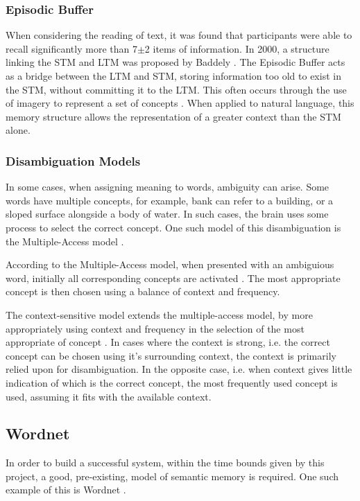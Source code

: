 \documentclass[]{article}
\begin{document}
\subsubsection{Episodic Buffer}
\label{sec:EpisodicBuffer}
When considering the reading of text, it was found that participants were able to recall significantly more than 7$\pm$2 items of information. In 2000, a structure linking the STM and LTM was proposed by Baddely \cite{BaddeleyEpisodicBuffer}. The Episodic Buffer acts as a bridge between the LTM and STM, storing information too old to exist in the STM, without committing it to the LTM. This often occurs through the use of imagery to represent a set of concepts \cite{MemoryBaddeleyEysenkAnderson}. When applied to natural language, this memory structure allows the representation of a greater context than the STM alone.

\subsubsection{Disambiguation Models}
\label{sec:DisambiguationModels}
In some cases, when assigning meaning to words, ambiguity can arise. Some words have multiple concepts, for example, bank can refer to a building, or a sloped surface alongside a body of water. In such cases, the brain uses some process to select the correct concept. One such model of this disambiguation is the Multiple-Access model \cite{PsychologyOfLanguage}.

According to the Multiple-Access model, when presented with an ambiguious word, initially all corresponding concepts are activated \cite{AccessingLexicalAmbiguities}. The most appropriate concept is then chosen using a balance of context and frequency.

The context-sensitive model extends the multiple-access model, by more appropriately using context and frequency in the selection of the most appropriate of concept \cite{PsychologyOfLanguage}. In cases where the context is strong, i.e. the correct concept can be chosen using it's surrounding context, the context is primarily relied upon for disambiguation. In the opposite case, i.e. when context gives little indication of which is the correct concept, the most frequently used concept is used, assuming it fits with the available context.


\subsection{Wordnet}
\label{Wordnet}
In order to build a successful system, within the time bounds given by this project, a good, pre-existing, model of semantic memory is required. One such example of this is Wordnet \cite{WN1Introduction}.
\end{document}
